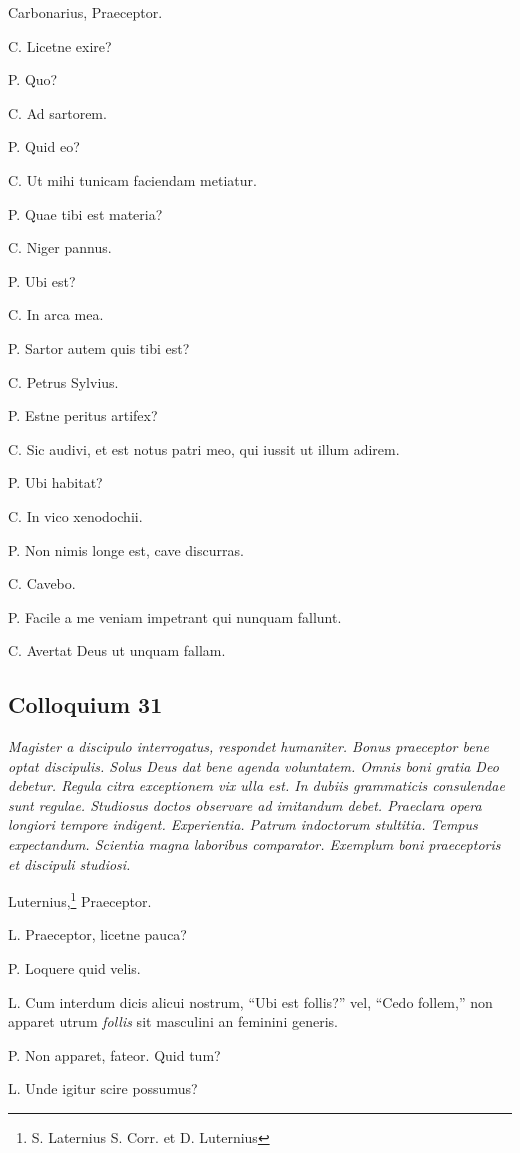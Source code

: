 \documentclass{article}
\begin{document}
Carbonarius, Praeceptor.

C. Licetne exire?

P. Quo?

C. Ad sartorem.

P. Quid eo?

C. Ut mihi tunicam faciendam metiatur.

P. Quae tibi est materia?

C. Niger pannus.

P. Ubi est?

C. In arca mea.

P. Sartor autem quis tibi est?

C. Petrus Sylvius.

P. Estne peritus artifex?

C. Sic audivi, et est notus patri meo, qui iussit ut illum adirem.

P. Ubi habitat?

C. In vico xenodochii.

P. Non nimis longe est, cave discurras.

C. Cavebo.

P. Facile a me veniam impetrant qui nunquam fallunt.

C. Avertat Deus ut unquam fallam.

\subsection{Colloquium 31}
\emph{Magister a discipulo interrogatus, respondet humaniter. Bonus praeceptor bene optat discipulis. Solus Deus dat bene agenda voluntatem. Omnis boni gratia Deo debetur. Regula citra exceptionem vix ulla est. In dubiis grammaticis consulendae sunt regulae. Studiosus doctos observare ad imitandum debet. Praeclara opera longiori tempore indigent. Experientia. Patrum indoctorum stultitia. Tempus expectandum. Scientia magna laboribus comparator. Exemplum boni praeceptoris et discipuli studiosi.}

Luternius,\footnote{S. Laternius S. Corr. et D. Luternius} Praeceptor.

L. Praeceptor, licetne pauca?

P. Loquere quid velis.

L. Cum interdum dicis alicui nostrum, ``Ubi est follis?'' vel, ``Cedo follem,'' non apparet utrum \emph{follis} sit masculini an feminini generis.

P. Non apparet, fateor. Quid tum?

L. Unde igitur scire possumus?
\end{document}
